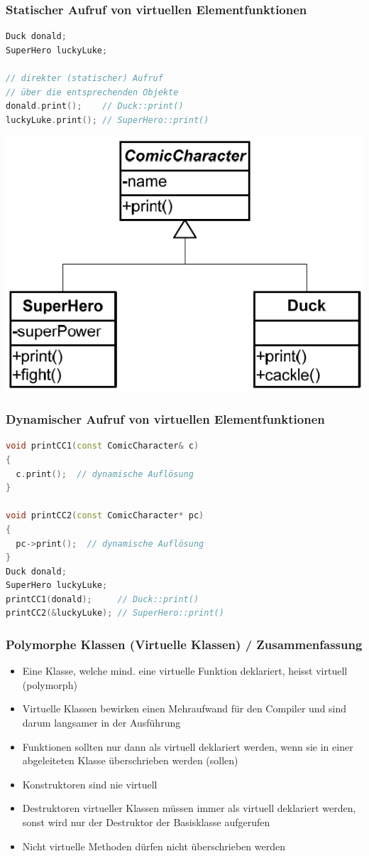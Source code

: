 \subsubsection{Statischer Aufruf von virtuellen Elementfunktionen}
\begin{multicols}{2}
\begin{lstlisting}[language=C++]
Duck donald;
SuperHero luckyLuke;

// direkter (statischer) Aufruf
// über die entsprechenden Objekte
donald.print();    // Duck::print()
luckyLuke.print(); // SuperHero::print()
\end{lstlisting}
\vfill\null
\columnbreak
\includegraphics[width=0.5\linewidth]{images/AdvancedCPP/classDiagram}
\end{multicols}

\subsubsection{Dynamischer Aufruf von virtuellen Elementfunktionen}
\begin{multicols}{2}
\begin{lstlisting}[language=C++]
void printCC1(const ComicCharacter& c)
{
  c.print();  // dynamische Auflösung
}

void printCC2(const ComicCharacter* pc)
{
  pc->print();  // dynamische Auflösung
}
Duck donald;
SuperHero luckyLuke;
printCC1(donald);     // Duck::print()
printCC2(&luckyLuke); // SuperHero::print()
\end{lstlisting}
\end{multicols}

\subsubsection{Polymorphe Klassen (Virtuelle Klassen) / Zusammenfassung}
\begin{itemize}
  \item Eine Klasse, welche mind. eine virtuelle Funktion deklariert, heisst virtuell (polymorph)
  \item Virtuelle Klassen bewirken einen Mehraufwand für den Compiler und sind darum langsamer in der Ausführung
  \item Funktionen sollten nur dann als virtuell deklariert werden, wenn sie in einer abgeleiteten Klasse überschrieben werden (sollen)
  \item Konstruktoren sind nie virtuell
  \item Destruktoren virtueller Klassen müssen immer als virtuell deklariert werden, sonst wird nur der Destruktor der Basisklasse aufgerufen
  \item Nicht virtuelle Methoden dürfen nicht überschrieben werden
\end{itemize}

